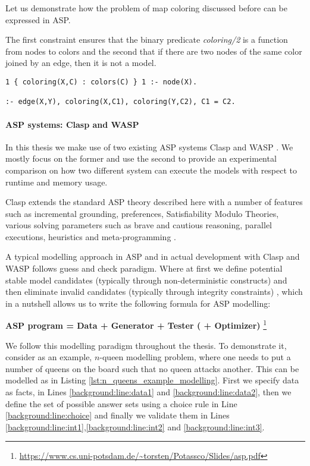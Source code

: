 \begin{example}
  Let us demonstrate how the problem of map coloring discussed before can be expressed in ASP. 

  The first constraint ensures that the binary predicate \textit{coloring/2} is a function from nodes to colors and the second that if there are two nodes of the same color joined by an edge, then it is not a model.
\begin{lstlisting}[caption=ASP encoding of map coloring constraints, label=lst:example_asp_coloring,basicstyle=\ttfamily]
1 { coloring(X,C) : colors(C) } 1 :- node(X).

:- edge(X,Y), coloring(X,C1), coloring(Y,C2), C1 = C2.
\end{lstlisting}
\end{example}

\paragraph{ASP systems: Clasp and WASP}
In this thesis we make use of two existing ASP systems Clasp \parencite{clasp} and WASP \parencite{wasp}. We mostly focus on the former and use the second to provide an experimental comparison on how two different system can execute the models with respect to runtime and memory usage.

Clasp extends the standard ASP theory described here with a number of features such as incremental grounding, preferences, Satisfiability Modulo Theories, various solving parameters such as brave and cautious reasoning, parallel executions, heuristics and meta-programming \parencite{ASPbook}.

A typical modelling approach in ASP and in actual development with Clasp and WASP follows guess and check paradigm. Where at first we define potential stable model candidates 
(typically through non-deterministic constructs) and then eliminate invalid candidates (typically through integrity constraints) \parencite{clasp, ASPbook, whatisasp}, which in a nutshell allows us to write the following formula for ASP modelling:

\begin{center}
    {\bfseries ASP program = Data + Generator + Tester ( + Optimizer)} \footnote{\url{https://www.cs.uni-potsdam.de/~torsten/Potassco/Slides/asp.pdf}}
\end{center}

We follow this modelling paradigm throughout the thesis. To demonstrate it, consider as an example, $n$-queen modelling problem, where one needs to put a number of queens on the board such that no queen attacks another. This can be modelled as in Listing \ref{lst:n_queens_example_modelling}. First we specify data as facts, in Lines \ref{background:line:data1} and \ref{background:line:data2}, then we define the set of possible answer sets using a choice rule in Line \ref{background:line:choice} and finally we validate them in Lines \ref{background:line:int1},\ref{background:line:int2} and \ref{background:line:int3}.

